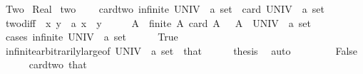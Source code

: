 %
\begin{isabellebody}%
%
%
\isamarkuptrue%
%
\isadelimtheory
%
\endisadelimtheory
%
\isatagtheory
{}\isamarkupfalse%
\ Two\isanewline
{}\ Real\isanewline
{}%
\endisatagtheory
{\isafoldtheory}%
%
\isadelimtheory
%
\endisadelimtheory
\isanewline
\isanewline
{}\isamarkupfalse%
\ two\ {\isacharequal}\isanewline
\ \ \ card{\isacharunderscore}two{\isacharcolon}\ {\isachardoublequoteopen}infinite\ {\isacharparenleft}UNIV\ {\isacharcolon}{\isacharcolon}\ {\isacharprime}a\ set{\isacharparenright}\ {\isasymor}\ card\ {\isacharparenleft}UNIV\ {\isacharcolon}{\isacharcolon}\ {\isacharprime}a\ set{\isacharparenright}\ {\isasymge}\ {}{\isachardoublequoteclose}\isanewline
{}\isanewline
\isanewline
{}\isamarkupfalse%
\ two{\isacharunderscore}diff{\isacharcolon}\ {\isachardoublequoteopen}{\isasymexists}\ x\ y\ {\isacharcolon}{\isacharcolon}\ {\isacharprime}a{\isachardot}\ x\ {\isasymnoteq}\ y{\isachardoublequoteclose}\isanewline
%
\isadelimproof
%
\endisadelimproof
%
\isatagproof
{}\isamarkupfalse%
\ {\isacharminus}\isanewline
\ \ \isamarkupfalse%
\ A\ \ {\isachardoublequoteopen}finite\ A{\isachardoublequoteclose}\ {\isachardoublequoteopen}card\ A\ {\isacharequal}\ {}{\isachardoublequoteclose}\ {\isachardoublequoteopen}A\ {\isasymsubseteq}\ {\isacharparenleft}UNIV\ {\isacharcolon}{\isacharcolon}\ {\isacharprime}a\ set{\isacharparenright}{\isachardoublequoteclose}\isanewline
\ \ \isamarkupfalse%
\ {\isacharparenleft}cases\ {\isachardoublequoteopen}infinite\ {\isacharparenleft}UNIV\ {\isacharcolon}{\isacharcolon}\ {\isacharprime}a\ set{\isacharparenright}{\isachardoublequoteclose}{\isacharparenright}\isanewline
\ \ \ \ \isamarkupfalse%
\ True\isanewline
\ \ \ \ \isamarkupfalse%
\ infinite{\isacharunderscore}arbitrarily{\isacharunderscore}large{\isacharbrackleft}of\ {\isachardoublequoteopen}UNIV\ {\isacharcolon}{\isacharcolon}\ {\isacharprime}a\ set{\isachardoublequoteclose}\ {}{\isacharbrackright}\ that\isanewline
\ \ \ \ \isamarkupfalse%
\ {\isacharquery}thesis\ \isamarkupfalse%
\ auto\isanewline
\ \ \isamarkupfalse%
\isanewline
\ \ \ \ \isamarkupfalse%
\ False\isanewline
\ \ \ \ \isamarkupfalse%
\ card{\isacharunderscore}two\ that\isanewline

\end{isabellebody}
